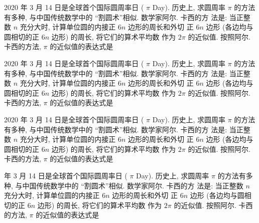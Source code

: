 \documentclass{ctexart}
\begin{document}
2020 年 3 月 14 日是全球首个国际圆周率日 ( $\pi$ Day). 历史上, 求圆周率 $\pi$ 的方法有多种, 与中国传统数学中的 “割圆术”相似. 数学家阿尔. 卡西的方 法是: 当正整数 $n$ 充分大时, 计算单位圆的内接正 $6 n$ 边形的周长和外切 正 $6 n$ 边形 (各边均与圆相切的正 $6 n$ 边形) 的周长, 将它们的算术平均数 作为 $2 \pi$ 的近似值. 按照阿尔. 卡西的方法, $\pi$ 的近似值的表达式是 \paren


2020 年 3 月 14 日是全球首个国际圆周率日 ( $\pi$ Day). 历史上, 求圆周率 $\pi$ 的方法有多种, 与中国传统数学中的 “割圆术”相似. 数学家阿尔. 卡西的方 法是: 当正整数 $n$ 充分大时, 计算单位圆的内接正 $6 n$ 边形的周长和外切 正 $6 n$ 边形 (各边均与圆相切的正 $6 n$ 边形) 的周长, 将它们的算术平均数 作为 $2 \pi$ 的近似值. 按照阿尔. 卡西的方法, $\pi$ 的近似值的表达式是 \paren


2020 年 3 月 14 日是全球首个国际圆周率日 ( $\pi$ Day). 历史上, 求圆周率 $\pi$ 的方法有多种, 与中国传统数学中的 “割圆术”相似. 数学家阿尔. 卡西的方 法是: 当正整数 $n$ 充分大时, 计算单位圆的内接正 $6 n$ 边形的周长和外切 正 $6 n$ 边形 (各边均与圆相切的正 $6 n$ 边形) 的周长, 将它们的算术平均数 作为 $2 \pi$ 的近似值. 按照阿尔. 卡西的方法, $\pi$ 的近似值的表达式是 \paren


 年 3 月 14 日是全球首个国际圆周率日 ( $\pi$ Day). 历史上, 求圆周率 $\pi$ 的方法有多种, 与中国传统数学中的 “割圆术”相似. 数学家阿尔. 卡西的方 法是: 当正整数 $n$ 充分大时, 计算单位圆的内接正 $6 n$ 边形的周长和外切 正 $6 n$ 边形 (各边均与圆相切的正 $6 n$ 边形) 的周长, 将它们的算术平均数 作为 $2 \pi$ 的近似值. 按照阿尔. 卡西的方法, $\pi$ 的近似值的表达式是 \paren
\end{document}
